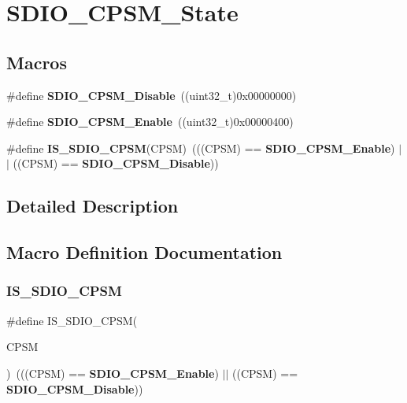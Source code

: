 \section{S\+D\+I\+O\+\_\+\+C\+P\+S\+M\+\_\+\+State}
\label{group__SDIO__CPSM__State}
\subsection*{Macros}
\begin{DoxyCompactItemize}
\item 
\#define \textbf{ S\+D\+I\+O\+\_\+\+C\+P\+S\+M\+\_\+\+Disable}~((uint32\+\_\+t)0x00000000)
\item 
\#define \textbf{ S\+D\+I\+O\+\_\+\+C\+P\+S\+M\+\_\+\+Enable}~((uint32\+\_\+t)0x00000400)
\item 
\#define \textbf{ I\+S\+\_\+\+S\+D\+I\+O\+\_\+\+C\+P\+SM}(C\+P\+SM)~(((C\+P\+SM) == \textbf{ S\+D\+I\+O\+\_\+\+C\+P\+S\+M\+\_\+\+Enable}) $\vert$$\vert$ ((C\+P\+SM) == \textbf{ S\+D\+I\+O\+\_\+\+C\+P\+S\+M\+\_\+\+Disable}))
\end{DoxyCompactItemize}


\subsection{Detailed Description}


\subsection{Macro Definition Documentation}
\mbox{\label{group__SDIO__CPSM__State_ga58cf04903dab015106e4e0937bef443b}} 
\subsubsection{I\+S\+\_\+\+S\+D\+I\+O\+\_\+\+C\+P\+SM}
{\footnotesize\ttfamily \#define I\+S\+\_\+\+S\+D\+I\+O\+\_\+\+C\+P\+SM(\begin{DoxyParamCaption}\item[{}]{C\+P\+SM }\end{DoxyParamCaption})~(((C\+P\+SM) == \textbf{ S\+D\+I\+O\+\_\+\+C\+P\+S\+M\+\_\+\+Enable}) $\vert$$\vert$ ((C\+P\+SM) == \textbf{ S\+D\+I\+O\+\_\+\+C\+P\+S\+M\+\_\+\+Disable}))}



